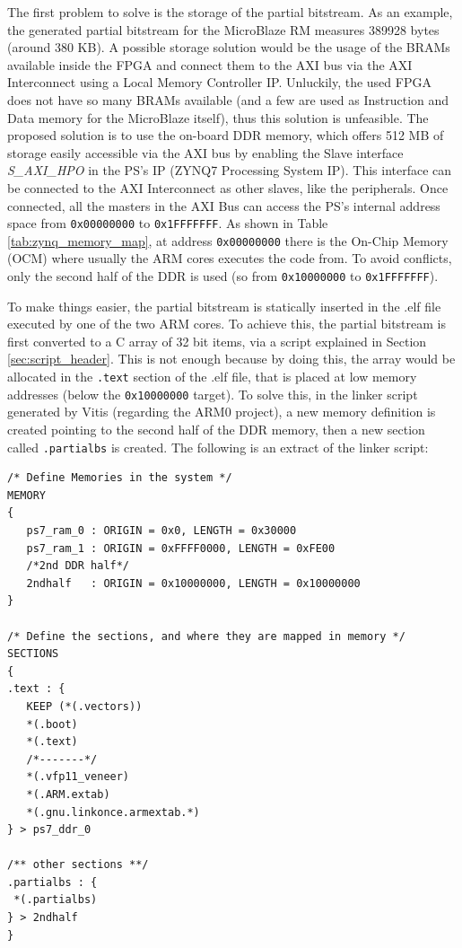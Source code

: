 The first problem to solve is the storage of the partial bitstream. As an example, the generated partial bitstream for the MicroBlaze RM measures 389928 bytes (around 380 KB). A possible storage solution would be the usage of the BRAMs available inside the FPGA and connect them to the AXI bus via the AXI Interconnect using a Local Memory Controller IP. Unluckily, the used FPGA does not have so many BRAMs available (and a few are used as Instruction and Data memory for the MicroBlaze itself), thus this solution is unfeasible. The proposed solution is to use the on-board DDR memory, which offers 512 MB of storage easily accessible via the AXI bus by enabling the Slave interface \textit{S\_AXI\_HPO} in the PS's IP (ZYNQ7 Processing System IP). This interface can be connected to the AXI Interconnect as other slaves, like the peripherals. Once connected, all the masters in the AXI Bus can access the PS's internal address space from \texttt{0x00000000} to \texttt{0x1FFFFFFF}. As shown in Table \ref{tab:zynq_memory_map}, at address \texttt{0x00000000} there is the On-Chip Memory (OCM) where usually the ARM cores executes the code from. To avoid conflicts, only the second half of the DDR is used (so from \texttt{0x10000000} to \texttt{0x1FFFFFFF}). \bigskip

To make things easier, the partial bitstream is statically inserted in the .elf file executed by one of the two ARM cores. To achieve this, the partial bitstream is first converted to a C array of 32 bit items, via a script explained in Section \ref{sec:script_header}. This is not enough because by doing this, the array would be allocated in the \texttt{.text} section of the .elf file, that is placed at low memory addresses (below the \texttt{0x10000000} target). To solve this, in the linker script generated by Vitis (regarding the ARM0 project), a new memory definition is created pointing to the second half of the DDR memory, then a new section called \texttt{.partialbs} is created. The following is an extract of the linker script:\bigskip

\begin{lstlisting}[style=preformatted]
/* Define Memories in the system */
MEMORY
{
   ps7_ram_0 : ORIGIN = 0x0, LENGTH = 0x30000
   ps7_ram_1 : ORIGIN = 0xFFFF0000, LENGTH = 0xFE00
   /*2nd DDR half*/
   2ndhalf	 : ORIGIN = 0x10000000, LENGTH = 0x10000000 
}

/* Define the sections, and where they are mapped in memory */
SECTIONS
{
.text : {
   KEEP (*(.vectors))
   *(.boot)
   *(.text)
   /*-------*/
   *(.vfp11_veneer)
   *(.ARM.extab)
   *(.gnu.linkonce.armextab.*)
} > ps7_ddr_0

/** other sections **/
.partialbs : {
 *(.partialbs)
} > 2ndhalf
}
\end{lstlisting}

